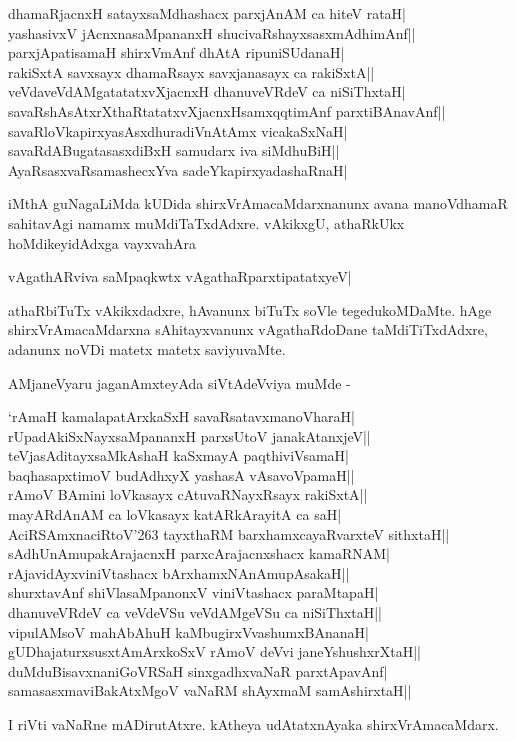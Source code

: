 \begin{shloka}
dhamaRjacnxH satayxsaMdhashacx parxjAnAM ca hiteV rataH|\label{223}\\
yashasivxV jAcnxnasaMpananxH shucivaRshayxsasxmAdhimAnf||\\
parxjApatisamaH shirxVmAnf dhAtA ripuniSUdanaH|\\
rakiSxtA savxsayx dhamaRsayx savxjanasayx ca rakiSxtA||\\
veVdaveVdAMgatatatxvXjacnxH dhanuveVRdeV ca niSiThxtaH|\\
savaRshAsAtxrXthaRtatatxvXjacnxHsamxqqtimAnf parxtiBAnavAnf||\\
savaRloVkapirxyasAsxdhuradiVnAtAmx vicakaSxNaH|\\
savaRdABugatasasxdiBxH samudarx iva siMdhuBiH||\\
AyaRsasxvaRsamashecxYva sadeYkapirxyadashaRnaH|
\end{shloka}

iMthA guNagaLiMda kUDida shirxVrAmacaMdarxnanunx avana manoVdhamaR sahitavAgi namamx muMdiTaTxdAdxre. vAkikxgU, athaRkUkx hoMdikeyidAdxga vayxvahAra 

\begin{shloka}
vAgathARviva saMpaqkwtx vAgathaRparxtipatatxyeV|\label{223a}
\end{shloka}
athaRbiTuTx vAkikxdadxre, hAvanunx biTuTx soVle tegedukoMDaMte. hAge shirxVrAmacaMdarxna sAhitayxvanunx vAgathaRdoDane taMdiTiTxdAdxre, adanunx noVDi matetx matetx saviyuvaMte.

AMjaneVyaru jaganAmxteyAda siVtAdeVviya muMde -

\begin{shloka}
`rAmaH kamalapatArxkaSxH savaRsatavxmanoVharaH|\\
rUpadAkiSxNayxsaMpananxH parxsUtoV janakAtanxjeV||\\
teVjasAditayxsaMkAshaH kaSxmayA paqthiviVsamaH|\\
baqhasapxtimoV budAdhxyX yashasA vAsavoVpamaH||\\
rAmoV BAmini loVkasayx cAtuvaRNayxRsayx rakiSxtA||\\
mayARdAnAM ca loVkasayx katARkArayitA ca saH|\\
AciRSAmxnaciRtoV\char'263 tayxthaRM barxhamxcayaRvarxteV sithxtaH||\\
sAdhUnAmupakArajacnxH parxcArajacnxshacx kamaRNAM|\\
rAjavidAyxviniVtashacx bArxhamxNAnAmupAsakaH||\\
shurxtavAnf shiVlasaMpanonxV viniVtashacx paraMtapaH|\\
dhanuveVRdeV ca veVdeVSu veVdAMgeVSu ca niSiThxtaH||\\
vipulAMsoV mahAbAhuH kaMbugirxVvashumxBAnanaH|\\
gUDhajaturxsusxtAmArxkoSxV rAmoV deVvi janeYshushxrXtaH||\\
duMduBisavxnaniGoVRSaH sinxgadhxvaNaR parxtApavAnf|\\
samasasxmaviBakAtxMgoV vaNaRM shAyxmaM samAshirxtaH||
\end{shloka}
I riVti vaNaRne mADirutAtxre. kAtheya udAtatxnAyaka shirxVrAmacaMdarx.

